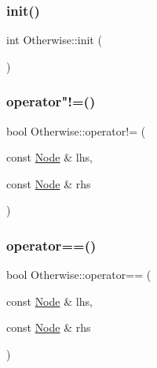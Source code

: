 \mbox{\label{namespace_otherwise_a235559dfa22004cafb278703e9121a2c}} 
\subsubsection{\texorpdfstring{init()}{init()}}
{\footnotesize\ttfamily int Otherwise\+::init (\begin{DoxyParamCaption}{ }\end{DoxyParamCaption})}

\mbox{\label{namespace_otherwise_a69a7d80f9434a4cc4104b3aa3d88707e}} 
\subsubsection{\texorpdfstring{operator"!=()}{operator!=()}}
{\footnotesize\ttfamily bool Otherwise\+::operator!= (\begin{DoxyParamCaption}\item[{const \hyperlink{struct_otherwise_1_1_node}{Node} \&}]{lhs,  }\item[{const \hyperlink{struct_otherwise_1_1_node}{Node} \&}]{rhs }\end{DoxyParamCaption})}

\mbox{\label{namespace_otherwise_a27a39e05e10a383316ec8881d4f76c54}} 
\subsubsection{\texorpdfstring{operator==()}{operator==()}\hspace{0.1cm}{\footnotesize\ttfamily [1/2]}}
{\footnotesize\ttfamily bool Otherwise\+::operator== (\begin{DoxyParamCaption}\item[{const \hyperlink{struct_otherwise_1_1_node}{Node} \&}]{lhs,  }\item[{const \hyperlink{struct_otherwise_1_1_node}{Node} \&}]{rhs }\end{DoxyParamCaption})}

\mbox{\label{namespace_otherwise_a4fab022ff458efa054c3367761497fdf}} 
